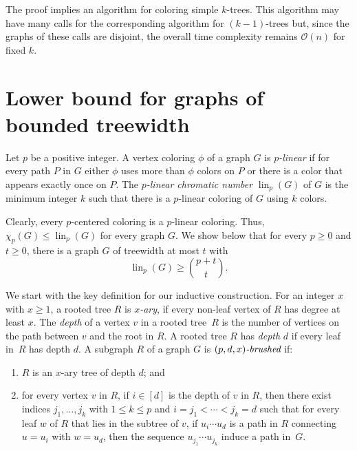 The proof implies an algorithm for coloring simple $k$-trees. This algorithm
may have many calls for the corresponding algorithm for $(k-1)$-trees but, 
since the graphs of these calls are disjoint, 
the overall time complexity remains $\mathcal{O}(n)$ for fixed $k$.


\section{Lower bound for graphs of bounded treewidth} 
\label{sec-lower-bounds-bounded-tw-linear}


Let $p$ be a positive integer. A vertex coloring $\phi$ of a graph $G$ is
\emph{$p$-linear} if for every path $P$ in $G$ either $\phi$ uses more than
$\phi$ colors on $P$ or there is a color that appears exactly once on $P$.
The \emph{$p$-linear chromatic number} $\operatorname{lin}_p(G)$ of $G$ is the minimum
integer $k$ such that there is a $p$-linear coloring of $G$ using $k$ colors.

Clearly, every $p$-centered coloring is a $p$-linear coloring. 
Thus, $\chi_p(G) \leq \operatorname{lin}_p(G)$ for every graph $G$.
We show below that 
for every $p\geq0$ and $t\geq0$, there is a graph $G$ of treewidth at most $t$ with 
\[
\operatorname{lin}_p(G) \geq \binom{p+t}{t}.
\]

We start with the key definition for our inductive construction.
For an integer $x$ with $x\geq1$, a rooted tree $R$ is \emph{$x$-ary}, 
if every non-leaf vertex of $R$ has degree at least $x$. 
The \emph{depth} of a vertex $v$ in a rooted tree~$R$ %
is the number of vertices on the path between $v$ and the root in $R$.
A rooted tree $R$ has \emph{depth} $d$ if every leaf in~$R$ has depth $d$.
A subgraph $R$ of a graph $G$ is $\emph{$(p,d,x)$-brushed}$ if:
\begin{enumerate}[label=\textup{(\roman*)},ref=\textup{\roman*},nosep]
  \item $R$ is an $x$-ary tree of depth $d$; and
  \item for every vertex $v$ in $R$,
  if $i\in[d]$ is the depth of $v$ in $R$, then
  there exist indices $j_1,\ldots,j_k$ with $1\leq k \leq p$ and $i=j_1 < \cdots < j_k=d$ such that for every leaf $w$ of $R$ that lies in the subtree of $v$, 
  if $u_i\cdots u_d$ is a path in $R$ connecting $u=u_i$ with $w=u_d$, then
  the sequence $u_{j_1}\cdots u_{j_k}$ induce a path in~$G$.
  \label{def-brushed-ii}
\end{enumerate}


